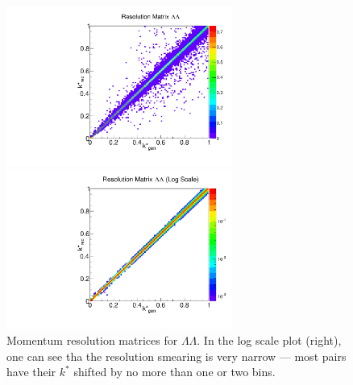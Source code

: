 \begin{figure}[ht]
\begin{minipage}{17.5pc}
\includegraphics[width=17.5pc]{Figures/2016-07-19-ResMatrixLambdaLambda.pdf}
\end{minipage}\hspace{0.5pc}
\begin{minipage}{17.5pc}
\includegraphics[width=17.5pc]{Figures/2016-07-19-ResMatrixLambdaLambdaLog.pdf}
\end{minipage} 
\caption[Momentum resolution matrices -- $\Lambda\Lambda$]{\label{fig:MomResLL} Momentum resolution matrices for $\Lambda\Lambda$. In the log scale plot (right), one can see tha the resolution smearing is very narrow --- most pairs have their $k^*$ shifted by no more than one or two bins.}
\end{figure}

